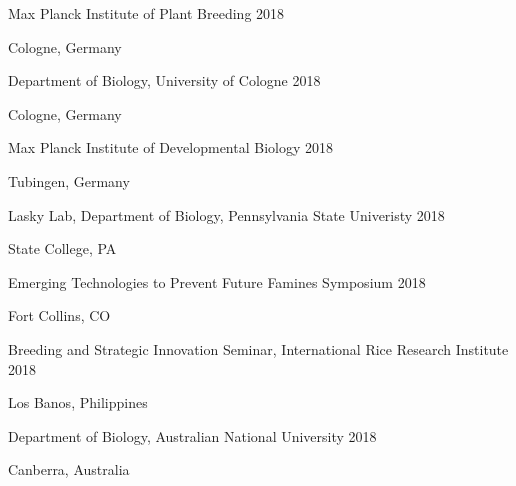 \documentclass[12pt,english]{article}
\begin{document}
\hspace*{1.0em}Max Planck Institute of Plant Breeding  \hfill 2018 \par
\hspace*{2.0em}Cologne, Germany \par\vspace{0.5ex}

\hspace*{1.0em}Department of Biology, University of Cologne  \hfill 2018 \par
\hspace*{2.0em}Cologne, Germany \par\vspace{0.5ex}

\hspace*{1.0em}Max Planck Institute of Developmental Biology  \hfill 2018 \par
\hspace*{2.0em}Tubingen, Germany  \par\vspace{0.5ex}

\hspace*{1.0em}Lasky Lab, Department of Biology, Pennsylvania State Univeristy  \hfill 2018 \par
\hspace*{2.0em}State College, PA \par\vspace{0.5ex}

\hspace*{1.0em}Emerging Technologies to Prevent Future Famines Symposium  \hfill 2018 \par
\hspace*{2.0em}Fort Collins, CO \par\vspace{0.5ex}

\hspace*{1.0em}Breeding and Strategic Innovation Seminar, International Rice Research Institute  \hfill 2018 \par
\hspace*{2.0em}Los Banos, Philippines \par\vspace{0.5ex}

\hspace*{1.0em}Department of Biology, Australian National University  \hfill 2018 \par
\hspace*{2.0em}Canberra, Australia \par\vspace{0.5ex}
\end{document}
